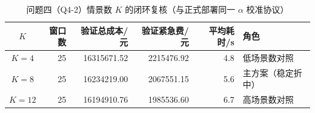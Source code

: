 \begin{table}[htbp]
\centering
\caption{问题四（Q4-2）情景数 $K$ 的闭环复核（与正式部署同一 $\alpha$ 校准协议）}\label{tab:q4-parameter}
\small\setlength{\tabcolsep}{3pt}
\begin{tabular}{@{}crrrrl@{}}
\toprule
$K$ & 窗口数 & 验证总成本/元 & 验证紧急费/元 & 平均耗时/s & 角色 \\
\midrule
$K=4$ & 25 & 16315671.52 & 2215476.92 & 4.8 & 低场景数对照 \\
$K=8$ & 25 & 16234219.00 & 2067551.15 & 5.6 & 主方案（稳定折中） \\
$K=12$ & 25 & 16194910.76 & 1985536.60 & 6.7 & 高场景数对照 \\\bottomrule
\end{tabular}
\end{table}
